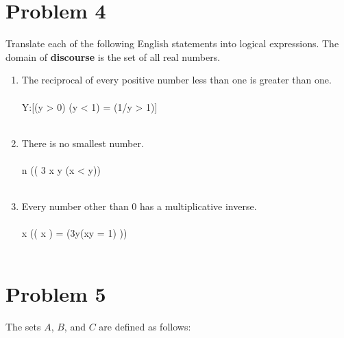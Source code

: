 \newpage


\section*{Problem 4}

Translate each of the following English statements into logical expressions. The domain of {\bf discourse} is the set of all real numbers.\\
\begin{enumerate}[label=(\alph*)]

\item The reciprocal of every positive number less than one is greater than one.\\\\
\forall Y:[(y > 0) \land (y < 1) = (1/y > 1)]
\\\\

\item There is no smallest number.\\\\
n (( 3 x \forall y (x < y))
\\\\

\item Every number other than 0 has a multiplicative inverse.\\\\
\forall x (( x ) = (3y(xy = 1) ))
\\\\
\end{enumerate}



 \newpage


\section*{Problem 5}
The sets $A$, $B$, and $C$ are defined as follows:\\

